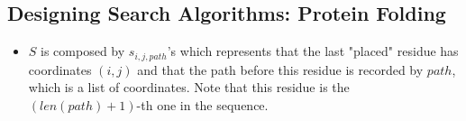 \documentclass[11pt]{article}
\begin{document}
\begin{onehalfspace}
    \section{Designing Search Algorithms: Protein Folding}
    \begin{itemize}
    \item
    $S$ is composed by $s_{i,j,path}$'s which represents that the last "placed" residue has coordinates $(i, j)$ and that the path before this residue is recorded by $path$, which is a list of coordinates. Note that this residue is the $(len(path) + 1)$-th one in the sequence.
    \end{itemize}
\end{onehalfspace}
\end{document}
